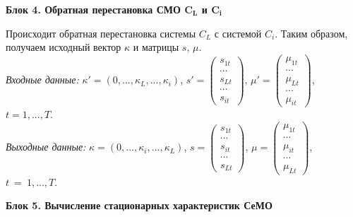 \medskip
\textbf{Блок 4. Обратная перестановка СМО $\boldsymbol{C_L}$ и $\boldsymbol{C_i}$}

Происходит обратная перестановка системы $C_ L$ с системой $C_i$. Таким образом, получаем исходный вектор $\kappa$ и матрицы $s$, $\mu$. \\
\textit{Входные данные:} $\kappa'=(0,...,\kappa_L,...,\kappa_i)$, $s'=\left( \begin{matrix}
s_{1t}\\
\cdots\\
s_{Lt}\\
\cdots\\
s_{it}
\end{matrix} \right )$, $\mu'=\left( \begin{matrix}
\mu_{1t}\\
\cdots\\
\mu_{Lt}\\
\cdots\\
\mu_{it}
\end{matrix} \right )$, $t=1,...,T$. \\
\textit{Выходные данные:} $\kappa=(0,...,\kappa_i,...,\kappa_L)$, $s=\left( \begin{matrix}
s_{1t}\\
\cdots\\
s_{it}\\
\cdots\\
s_{Lt}
\end{matrix} \right )$, $\mu=\left( \begin{matrix}
\mu_{1t}\\
\cdots\\
\mu_{it}\\
\cdots\\
\mu_{Lt}
\end{matrix} \right )$, $t~=~1,...,T$.

\medskip
\textbf{Блок 5. Вычисление стационарных характеристик СеМО}

